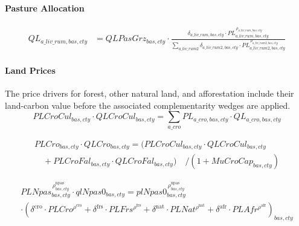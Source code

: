 \paragraph{Pasture Allocation}
\begin{align}
  QL_{a\_liv\_rum,bas,cty}
  &= QLPasGrz_{bas,cty}
     \cdot
     \frac{
       \delta_{a\_liv\_rum,bas,cty}\cdot PL_{a\_liv\_rum,bas,cty}^{\,\rho_{a\_liv\_rum,bas,cty}}
     }{
       \sum_{a\_liv\_rum2}\delta_{a\_liv\_rum2,bas,cty}\cdot PL_{a\_liv\_rum2,bas,cty}^{\,\rho_{a\_liv\_rum2,bas,cty}}
     }
  \tag{LivDistEq}\label{eq:LivDistEq}
\end{align}


\paragraph{Land Prices}
The price drivers for forest, other natural land, and afforestation include their land-carbon value before the associated complementarity wedges are applied.
\begin{equation}
  PLCroCul_{bas,cty}\cdot QLCroCul_{bas,cty}
  = \sum_{a\_cro} PL_{a\_cro,bas,cty}\cdot QL_{a\_cro,bas,cty}
  \tag{PLCroCulEq}\label{eq:PLCroCulEq}
\end{equation}

\vspace{0.3\baselineskip}

\begin{multline}
  PLCro_{bas,cty}\cdot QLCro_{bas,cty}
  = \bigl(
       PLCroCul_{bas,cty}\cdot QLCroCul_{bas,cty}
       \\[-0.3em]
  \quad
       + PLCroFal_{bas,cty}\cdot QLCroFal_{bas,cty}
     \bigr)
  \quad / (1 + MuCroCap_{bas,cty})
  \tag{PLCroEq}\label{eq:PLCroEq}
\end{multline}

\vspace{0.3\baselineskip}

\begin{multline}
  PLNpas_{bas,cty}^{\,\rho^{\text{npas}}_{bas,cty}}
  \cdot qlNpas0_{bas,cty}
  = plNpas0_{bas,cty}^{\,\rho^{\text{npas}}_{bas,cty}}
  \\
  \cdot \left(
    \delta^{\text{cro}} \cdot PLCro^{\rho^{\text{cro}}}
    + \delta^{\text{frs}} \cdot PLFrs^{\rho^{\text{frs}}}
    + \delta^{\text{nat}} \cdot PLNat^{\rho^{\text{nat}}}
    + \delta^{\text{afr}} \cdot PLAfr^{\rho^{\text{afr}}}
  \right)_{bas,cty}
  \tag{PLNpasEq}\label{eq:PLNpasEq}
\end{multline}

